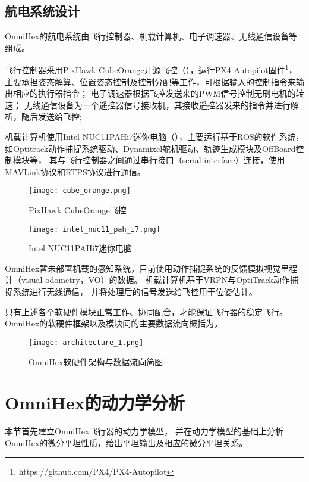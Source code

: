 \subsection{航电系统设计}\label{subsec:avionics_system_design}
OmniHex的航电系统由飞行控制器、机载计算机、电子调速器、无线通信设备等组成。

飞行控制器采用PixHawk CubeOrange开源飞控（），运行PX4-Autopilot固件\footnote{https://github.com/PX4/PX4-Autopilot}，
主要承担姿态解算、位置姿态控制及控制分配等工作，可根据输入的控制指令来输出相应的执行器指令；
电子调速器根据飞控发送来的PWM信号控制无刷电机的转速；
无线通信设备为一个遥控器信号接收机，其接收遥控器发来的指令并进行解析，随后发送给飞控;

机载计算机使用Intel NUC11PAHi7迷你电脑（），主要运行基于ROS的软件系统，如Optitrack动作捕捉系统驱动、Dynamixel舵机驱动、轨迹生成模块及OffBoard控制模块等，
其与飞行控制器之间通过串行接口（serial interface）连接，使用MAVLink协议和RTPS协议进行通信。
\begin{figure}[htbp]
    \centering
    \begin{minipage}[t]{0.4\textwidth}
    \centering
    \texttt{[image: cube\_orange.png]}
    \caption{PixHawk CubeOrange飞控\label{fig:cube_orange}}
    \end{minipage}
    \centering
    \begin{minipage}[t]{0.4\textwidth}
    \centering
    \texttt{[image: intel\_nuc11\_pah\_i7.png]}
    \caption{Intel NUC11PAHi7迷你电脑\label{fig:nuc}}
    \end{minipage}
\end{figure}

OmniHex暂未部署机载的感知系统，目前使用动作捕捉系统的反馈模拟视觉里程计（visual odometry，VO）的数据。
机载计算机基于VRPN\cite{taylor2001vrpn}与OptiTrack动作捕捉系统进行无线通信，
并将处理后的信号发送给飞控用于位姿估计。

只有上述各个软硬件模块正常工作、协同配合，才能保证飞行器的稳定飞行。
OmniHex的软硬件框架以及模块间的主要数据流向概括为。
\begin{figure}[ht]
    \centering
    \texttt{[image: architecture\_1.png]}
    \caption{OmniHex软硬件架构与数据流向简图}
    \label{fig:architecture_1}
\end{figure}

\section{OmniHex的动力学分析}\label{sec:dynamic_analysis}
本节首先建立OmniHex飞行器的动力学模型，
并在动力学模型的基础上分析OmniHex的微分平坦性质，给出平坦输出及相应的微分平坦关系。

